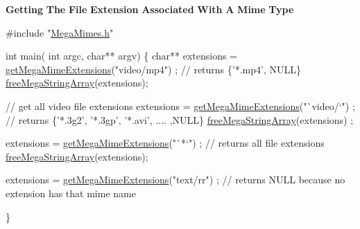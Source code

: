 {\bfseries Getting} {\bfseries The} {\bfseries File} {\bfseries Extension} {\bfseries Associated} {\bfseries With} {\bfseries A} {\bfseries Mime} {\bfseries Type} 
\begin{DoxyCode}
\textcolor{preprocessor}{#include "\hyperlink{MegaMimes_8h}{MegaMimes.h}"}
 
 \textcolor{keywordtype}{int} main( \textcolor{keywordtype}{int} argc, \textcolor{keywordtype}{char}** argv)
 \{
    \textcolor{keywordtype}{char}** extensions = \hyperlink{MegaMimes_8h_a29775655c03675b861aa29571b394283}{getMegaMimeExtensions}(\textcolor{stringliteral}{"video/mp4"}) ;
    \textcolor{comment}{// returns \{'*.mp4', NULL\}}
    \hyperlink{MegaMimes_8h_ac51929b1a876c679b38af9f0854ecd41}{freeMegaStringArray}(extensions);

    \textcolor{comment}{// get all video file extensions}
   extensions = \hyperlink{MegaMimes_8h_a29775655c03675b861aa29571b394283}{getMegaMimeExtensions}(\textcolor{stringliteral}{"`video/`"}) ; 
   \textcolor{comment}{// returns \{'*.3g2', '*.3gp', '*.avi', .... ,NULL\}}
   \hyperlink{MegaMimes_8h_ac51929b1a876c679b38af9f0854ecd41}{freeMegaStringArray}(extensions) ;

   extensions = \hyperlink{MegaMimes_8h_a29775655c03675b861aa29571b394283}{getMegaMimeExtensions}(\textcolor{stringliteral}{"`*`"}) ;
   \textcolor{comment}{// returns all file extensions}
   \hyperlink{MegaMimes_8h_ac51929b1a876c679b38af9f0854ecd41}{freeMegaStringArray}(extensions);

   extensions = \hyperlink{MegaMimes_8h_a29775655c03675b861aa29571b394283}{getMegaMimeExtensions}(\textcolor{stringliteral}{"text/rr"}) ;
   \textcolor{comment}{// returns NULL because no extension has that mime name }

 \}
\end{DoxyCode}


